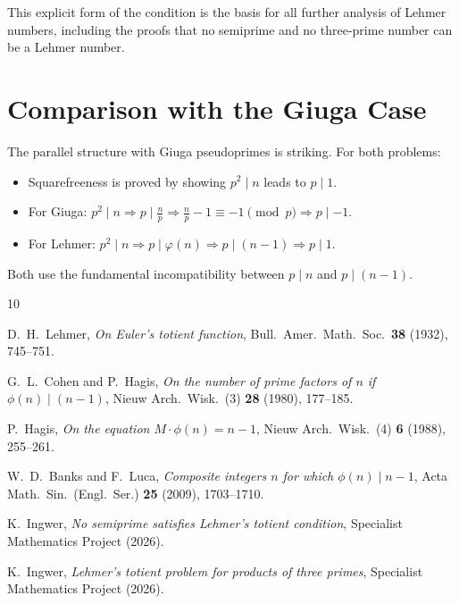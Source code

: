 \documentclass[12pt,a4paper]{amsart}
\theoremstyle{definition}
\newcommand{\euler}{\varphi}
\begin{document}
This explicit form of the condition is the basis for all further analysis of
Lehmer numbers, including the proofs that no semiprime \cite{Ingwer2026b} and
no three-prime number \cite{Ingwer2026lehmer3} can be a Lehmer number.

\section{Comparison with the Giuga Case}

The parallel structure with Giuga pseudoprimes is striking.  For both problems:
\begin{itemize}
  \item Squarefreeness is proved by showing $p^2 \mid n$ leads to $p \mid 1$.
  \item For Giuga: $p^2 \mid n \Rightarrow p \mid \tfrac{n}{p} \Rightarrow \tfrac{n}{p}-1 \equiv -1 \pmod{p} \Rightarrow p \mid -1$.
  \item For Lehmer: $p^2 \mid n \Rightarrow p \mid \euler(n) \Rightarrow p \mid (n-1) \Rightarrow p \mid 1$.
\end{itemize}
Both use the fundamental incompatibility between $p \mid n$ and $p \mid (n-1)$.

\begin{thebibliography}{10}

D.~H.~Lehmer,
\emph{On Euler's totient function},
Bull.\ Amer.\ Math.\ Soc.\ \textbf{38} (1932), 745--751.

G.~L.~Cohen and P.~Hagis,
\emph{On the number of prime factors of $n$ if $\phi(n) \mid (n-1)$},
Nieuw Arch.\ Wisk.\ (3) \textbf{28} (1980), 177--185.

P.~Hagis,
\emph{On the equation $M \cdot \phi(n) = n - 1$},
Nieuw Arch.\ Wisk.\ (4) \textbf{6} (1988), 255--261.

W.~D.~Banks and F.~Luca,
\emph{Composite integers $n$ for which $\phi(n) \mid n - 1$},
Acta Math.\ Sin.\ (Engl.\ Ser.) \textbf{25} (2009), 1703--1710.

K.~Ingwer,
\emph{No semiprime satisfies Lehmer's totient condition},
Specialist Mathematics Project (2026).

K.~Ingwer,
\emph{Lehmer's totient problem for products of three primes},
Specialist Mathematics Project (2026).

\end{thebibliography}
\end{document}
